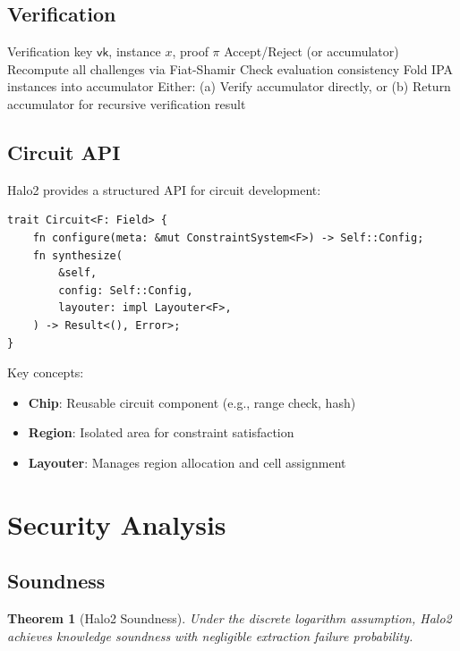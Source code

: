 \documentclass[11pt,a4paper]{article}
\newtheorem{theorem}{Theorem}[section]
\begin{document}
\subsection{Verification}

\begin{algorithm}
\caption{Halo2 Verifier}
\label{alg:halo2-verify}
\begin{algorithmic}[1]
\Require Verification key $\mathsf{vk}$, instance $x$, proof $\pi$
\Ensure Accept/Reject (or accumulator)
\State Recompute all challenges via Fiat-Shamir
\State Check evaluation consistency
\State Fold IPA instances into accumulator
\State Either:
\State \quad (a) Verify accumulator directly, or
\State \quad (b) Return accumulator for recursive verification
\State \Return result
\end{algorithmic}
\end{algorithm}

\subsection{Circuit API}

Halo2 provides a structured API for circuit development:

\begin{verbatim}
trait Circuit<F: Field> {
    fn configure(meta: &mut ConstraintSystem<F>) -> Self::Config;
    fn synthesize(
        &self,
        config: Self::Config,
        layouter: impl Layouter<F>,
    ) -> Result<(), Error>;
}
\end{verbatim}

Key concepts:
\begin{itemize}
    \item \textbf{Chip}: Reusable circuit component (e.g., range check, hash)
    \item \textbf{Region}: Isolated area for constraint satisfaction
    \item \textbf{Layouter}: Manages region allocation and cell assignment
\end{itemize}

\section{Security Analysis}

\subsection{Soundness}

\begin{theorem}[Halo2 Soundness]
Under the discrete logarithm assumption, Halo2 achieves knowledge soundness with negligible extraction failure probability.
\end{theorem}
\end{document}
